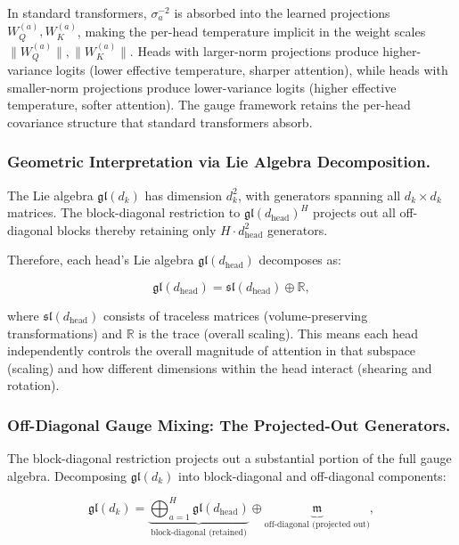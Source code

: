 \documentclass[twoside,11pt]{article}
\begin{document}
In standard transformers, $\sigma_a^{-2}$ is absorbed into the learned projections $W_Q^{(a)}, W_K^{(a)}$, making the per-head temperature implicit in the weight scales $\|W_Q^{(a)}\|, \|W_K^{(a)}\|$. Heads with larger-norm projections produce higher-variance logits (lower effective temperature, sharper attention), while heads with smaller-norm projections produce lower-variance logits (higher effective temperature, softer attention). The gauge framework retains the per-head covariance structure that standard transformers absorb.

\subsubsection{Geometric Interpretation via Lie Algebra Decomposition.}

The Lie algebra $\mathfrak{gl}(d_k)$ has dimension $d_k^2$, with generators spanning all $d_k \times d_k$ matrices. The block-diagonal restriction to $\mathfrak{gl}(d_{\text{head}})^H$ projects out all off-diagonal blocks thereby retaining only $H \cdot d_{\text{head}}^2$ generators.

Therefore, each head's Lie algebra $\mathfrak{gl}(d_{\text{head}})$ decomposes as:

\begin{equation}
\mathfrak{gl}(d_{\text{head}}) = \mathfrak{sl}(d_{\text{head}}) \oplus \mathbb{R},
\end{equation}

where $\mathfrak{sl}(d_{\text{head}})$ consists of traceless matrices (volume-preserving transformations) and $\mathbb{R}$ is the trace (overall scaling). This means each head independently controls the overall magnitude of attention in that subspace (scaling) and how different dimensions within the head interact (shearing and rotation).

\subsubsection{Off-Diagonal Gauge Mixing: The Projected-Out Generators.}
\label{sec:off_diagonal_mixing}

The block-diagonal restriction projects out a substantial portion of the full gauge algebra. Decomposing $\mathfrak{gl}(d_k)$ into block-diagonal and off-diagonal components:

\begin{equation}
\mathfrak{gl}(d_k) = \underbrace{\bigoplus_{a=1}^{H} \mathfrak{gl}(d_{\text{head}})}_{\text{block-diagonal (retained)}} \oplus \underbrace{\mathfrak{m}}_{\text{off-diagonal (projected out)}},
\label{eq:lie_algebra_decomposition}
\end{equation}
\end{document}
